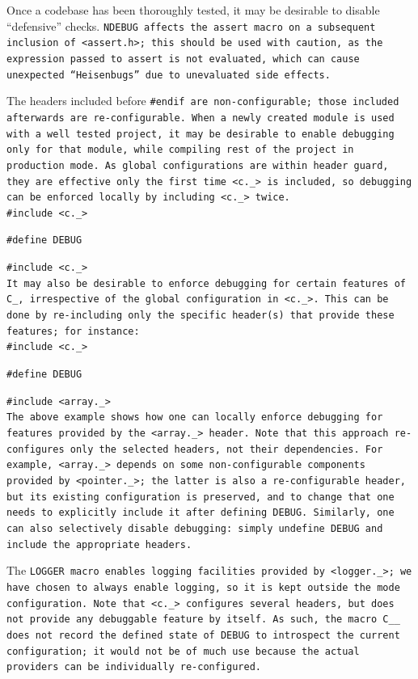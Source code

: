 \pagebreak

Once a codebase has been thoroughly tested,
it may be desirable to disable ``defensive'' checks.
\tt{NDEBUG} affects the \tt{assert} macro
on a subsequent inclusion of \tt{<assert.h>};
this should be used with caution,
as the expression passed to \tt{assert} is not evaluated,
which can cause unexpected ``Heisenbugs'' due to unevaluated side effects.

The headers included before \tt{#endif} are non-configurable;
those included afterwards are re-configurable.
When a newly created module is used with a well tested project,
it may be desirable to enable debugging only for that module,
while compiling rest of the project in production mode.
As global configurations are within header guard,
they are effective only the first time \tt{<c._>} is included,
so debugging can be enforced locally by including \tt{<c._>} twice.\\

\tt{#include <c._>}

\tt{#define DEBUG}

\tt{#include <c._>}\\

It may also be desirable to enforce debugging for certain features of C\_,
irrespective of the global configuration in \tt{<c._>}.
This can be done by re-including only the specific
header(s) that provide these features; for instance:\\

\tt{#include <c._>}

\tt{#define DEBUG}

\tt{#include <array._>}\\

The above example shows how one can locally enforce
debugging for features provided by the \tt{<array._>} header.
Note that this approach re-configures only the selected headers,
not their dependencies.
For example, \tt{<array._>} depends on some
non-configurable components provided by \tt{<pointer._>};
the latter is also a re-configurable header,
but its existing configuration is preserved,
and to change that one needs to explicitly include it after defining \tt{DEBUG}.
Similarly, one can also selectively disable debugging:
simply undefine \tt{DEBUG} and include the appropriate headers.

The \tt{LOGGER} macro enables logging facilities provided by \tt{<logger._>};
we have chosen to always enable logging,
so it is kept outside the mode configuration.
Note that \tt{<c._>} configures several headers,
but does not provide any debuggable feature by itself.
As such, the macro \tt{C__} does not record the \tt{defined}
state of \tt{DEBUG} to introspect the current configuration;
it would not be of much use because the actual
providers can be individually re-configured.

